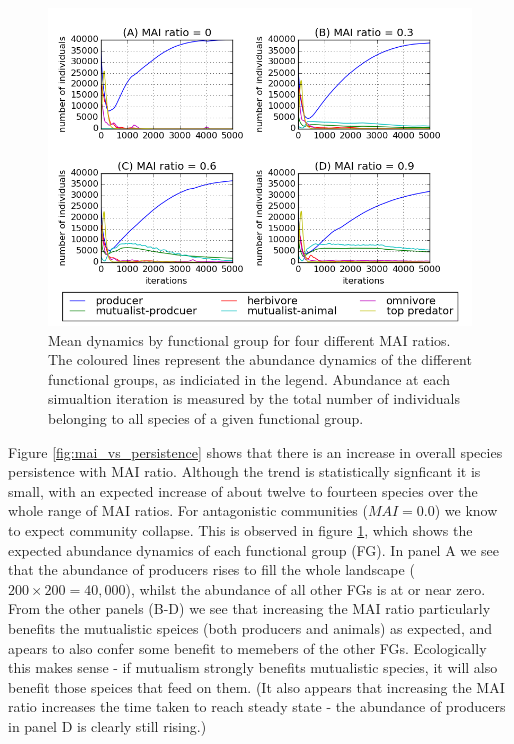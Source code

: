 \begin{figure}[h!]
	\centering
	\includegraphics[width=0.8\linewidth]{"figures/mean_trophic_dynamics"}
	\caption{Mean dynamics by functional group for four different MAI ratios. The coloured lines represent the abundance dynamics of the different functional groups, as indiciated in the legend. Abundance at each simualtion iteration is measured by the total number of individuals belonging to all species of a given functional group.}
	\label{fig:mvp_mean_dynamics}
\end{figure}


Figure \ref{fig:mai_vs_persistence} shows that there is an increase in overall species persistence with MAI ratio. Although the trend is statistically signficant it is small, with an expected increase of about twelve to fourteen species over the whole range of MAI ratios. For antagonistic communities ($MAI=0.0$) we know to expect community collapse. This is observed in figure \ref{fig:mvp_mean_dynamics}, which shows the expected abundance dynamics of each functional group (FG). In panel A we see that the abundance of producers rises to fill the whole landscape ($200 \times 200=40,000$), whilst the abundance of all other FGs is at or near zero. From the other panels (B-D) we see that increasing the MAI ratio particularly benefits the mutualistic speices (both producers and animals) as expected, and apears to also confer some benefit to memebers of the other FGs. Ecologically this makes sense - if mutualism strongly benefits mutualistic species, it will also benefit those speices that feed on them. (It also appears that increasing the MAI ratio increases the time taken to reach steady state - the abundance of producers in panel D is clearly still rising.) 

